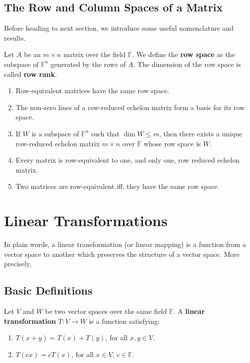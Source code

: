 \subsection{The Row and Column Spaces of a Matrix}

Before heading to next section, we introduce some useful nomenclature and results.

\begin{definition}
	Let $A$ be an $m \times n$ matrix over the field $\mathbb{F}$. We define the \textbf{row space} as the subspace of $\mathbb{F}^n$ generated by the rows of $A$. The dimension of the row space is called \textbf{row rank}.
\end{definition}

\begin{theorem} \hfill
	\begin{enumerate}
		\item Row-equivalent matrices have the same row space.
		\item The non-zero lines of a row-reduced echelon matrix form a basis for its row space.
		\item If $W$ is a subspace of $\mathbb{F}^n$ such that $\dim W \leq m$, then there exists a unique row-reduced echelon matrix $m \times n$ over $\mathbb{F}$ whose row space is $W$.
		\item Every matrix is row-equivalent to one, and only one, row reduced echelon matrix.
		\item Two matrices are row-equivalent iff. they have the same row space.
	\end{enumerate}
\end{theorem}
 
\section{Linear Transformations}

In plain words, a linear transformation (or linear mapping) is a function from a vector space to another which preserves the structure of a vector space. More precisely,

\subsection{Basic Definitions}

\begin{definition}
	Let $V$ and $W$ be two vector spaces over the same field $\mathbb{F}$. A \textbf{linear transformation} $T : V \longrightarrow W$ is a function satisfying:
	\begin{enumerate}
		\item $T(x+y) = T(x) + T(y)$, for all $x,y \in V$.
		\item $T(c x) = c T(x)$, for all $x \in V$, $c \in \mathbb{F}$.
	\end{enumerate}
\end{definition}

